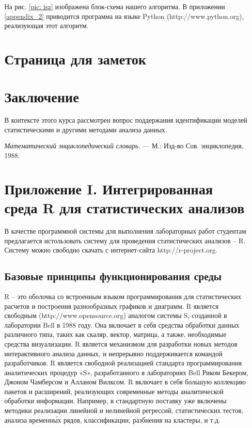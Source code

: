 \documentclass[12pt, openany, twoside]{book} %
\begin{document}
На рис. \ref{pic: isz} изображена блок-схема нашего алгоритма. В приложении \ref{appendix_2} приводится программа на языке Python (http://www.python.org), реализующая этот алгоритм.

\chapter*{Страница для заметок}

\chapter*{Заключение}


В контексте этого курса рассмотрен вопрос поддержания идентификации моделей статистическими и другими методами анализа данных.


\begin{thebibliography}{99}
 \emph{Математический энциклопедический словарь.} ---
М.: Изд-во Сов. энциклопедия, 1988.
\end{thebibliography}
\chapter*{Приложение I. Интегрированная среда R для статистических анализов}

В качестве программной системы для выполнения лабораторных работ студентам предлагается истользовать систему для проведения статистических анализов – R. Систему можно свободно скачать с интернет-сайта http://r-project.org.

\section{Базовые принципы функционирования среды}

R – это оболочка со встроенным языком программирования для статистических расчетов и построения разнообразных графиков и диаграмм. R является свободным (http://www.opensource.org) аналогом системы S, созданной в лаборатории Bell в 1988 году. Она включает в себя средства обработки данных различного типа, таких как скаляр, вектор, матрица, а также, необходимые средства визуализации. R является механизмом для разработки новых методов интерактивного анализа данных, и непрерывно поддерживается командой разработчиков. R является свободной реализацией стандарта программирования аналитических процедур «S», разработанного в лабораториях Bell Риком Бекером, Джоном Чамберсом и Алланом Вилксом. R включает в себя большую коллекцию пакетов и расширений, реализующих современные методы аналитической обработки информации. Например, в стандартную поставку уже включены методики реализации линейной и нелинейной регрессий, статистических тестов, анализа временн\'{ы}х рядов, классификации, разбиения на кластеры, и т.д.
\end{document}
